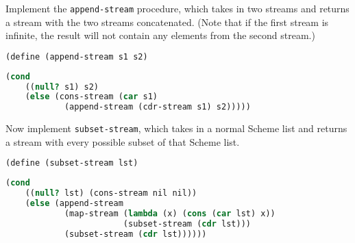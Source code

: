 \question Implement the \texttt{append-stream} procedure, which takes in two
streams and returns a stream with the two streams concatenated. (Note that if
the first stream is infinite, the result will not contain any elements from the
second stream.)

\begin{lstlisting}[language=Scheme]
(define (append-stream s1 s2)
\end{lstlisting}
\begin{solution}[3in]
\begin{lstlisting}[language=Scheme]
  (cond
    ((null? s1) s2)
    (else (cons-stream (car s1)
            (append-stream (cdr-stream s1) s2)))))
\end{lstlisting}
\end{solution}

\question Now implement \texttt{subset-stream}, which takes in a normal Scheme
list and returns a stream with every possible subset of that Scheme list.

\begin{lstlisting}[language=Scheme]
(define (subset-stream lst)
\end{lstlisting}
\begin{solution}[3in]
\begin{lstlisting}[language=Scheme]
  (cond
    ((null? lst) (cons-stream nil nil))
    (else (append-stream
            (map-stream (lambda (x) (cons (car lst) x))
                        (subset-stream (cdr lst)))
            (subset-stream (cdr lst))))))
\end{lstlisting}
\end{solution}

\clearpage
